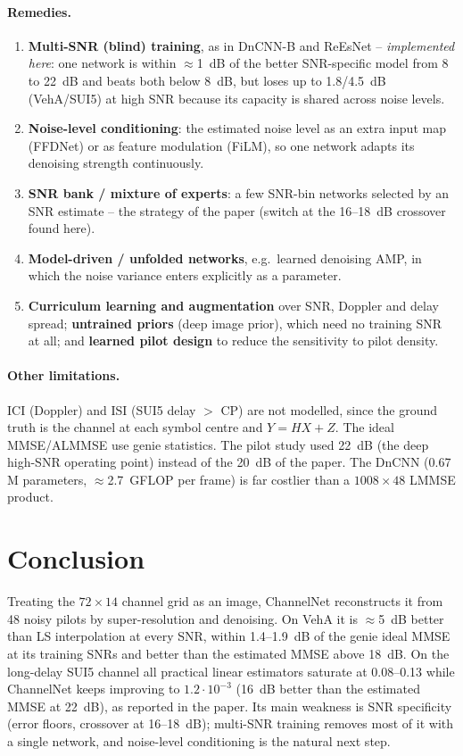 \documentclass[10pt,a4paper]{article}
\begin{document}
\paragraph{Remedies.}
\begin{enumerate}
  \item \textbf{Multi-SNR (blind) training}, as in DnCNN-B and ReEsNet --
    \emph{implemented here}: one network is within $\approx$1~dB of the better SNR-specific model from 8 to
    22~dB and beats both below 8~dB, but loses up to 1.8/4.5~dB (VehA/SUI5) at high SNR because its capacity
    is shared across noise levels.
  \item \textbf{Noise-level conditioning}: the estimated noise level as an extra input map (FFDNet)
    or as feature modulation (FiLM), so one network adapts its denoising strength continuously.
  \item \textbf{SNR bank / mixture of experts}: a few SNR-bin networks selected by an SNR estimate -- the
    strategy of the paper (switch at the 16--18~dB crossover found here).
  \item \textbf{Model-driven / unfolded networks}, e.g.\ learned denoising AMP, in which the noise
    variance enters explicitly as a parameter.
  \item \textbf{Curriculum learning and augmentation} over SNR, Doppler and delay spread;
    \textbf{untrained priors} (deep image prior), which need no training SNR at all; and
    \textbf{learned pilot design} to reduce the sensitivity to pilot density.
\end{enumerate}

\paragraph{Other limitations.} ICI (Doppler) and ISI (SUI5 delay $>$ CP) are not modelled, since the ground
truth is the channel at each symbol centre and $Y = HX + Z$. The ideal MMSE/ALMMSE use genie statistics. The
pilot study used 22~dB (the deep high-SNR operating point) instead of the 20~dB of the paper. The DnCNN
(0.67\,M parameters, $\approx$2.7~GFLOP per frame) is far costlier than a $1008\times48$ LMMSE product.

\section{Conclusion}

Treating the $72\times14$ channel grid as an image, ChannelNet reconstructs it from 48 noisy pilots by
super-resolution and denoising. On VehA it is $\approx$5~dB better than LS interpolation at every SNR,
within 1.4--1.9~dB of the genie ideal MMSE at its training SNRs and better than the estimated MMSE above
18~dB. On the long-delay SUI5 channel all practical linear estimators saturate at 0.08--0.13 while
ChannelNet keeps improving to $1.2\cdot10^{-3}$ (16~dB better than the estimated MMSE at 22~dB), as reported
in the paper. Its main weakness is SNR specificity (error floors, crossover at 16--18~dB); multi-SNR
training removes most of it with a single network, and noise-level conditioning is the natural next step.
\end{document}
